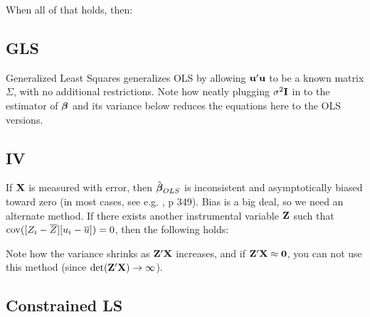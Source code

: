 When all of that holds, then:


\subsection{GLS} \label{GLS}
Generalized Least Squares generalizes OLS by allowing ${\bf u}'{\bf u}$ to be a
known matrix $\Sigma$, with no additional restrictions.
Note how neatly plugging $\sigma^2{\bf I}$ in to the
estimator of ${\mbox{\boldmath$\beta$}}$ and its variance below reduces the equations here to the OLS
versions.


\subsection{IV}  
	\label{IV} 
If ${\bf X}$ is measured with error, then $\hat{{\mbox{\boldmath$\beta$}}}_{OLS}$ is inconsistent and
asymptotically biased toward zero (in most cases, see e.g. \cite{kmenta},
p 349). Bias is a big deal, so we need an alternate method. If there exists
another instrumental variable ${\bf Z}$ such that $\operatorname{cov}([Z_i-\overline
Z][u_i-\overline u])=0$, then the following holds:


Note how the variance shrinks as ${\bf Z}'{\bf X}$ increases, and if
${\bf Z}'{\bf X}\approx{\bf 0}$, you can not use this method (since
$\det({\bf Z}'{\bf X}) \to \infty$). 

\subsection{Constrained LS }
\label{constrainedls}

